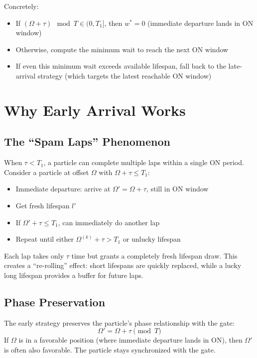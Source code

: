 \documentclass{article}
\begin{document}
Concretely:
\begin{itemize}
    \item If $(\Omega + \tau) \mod T \in (0, T_1]$, then $w^* = 0$ (immediate departure lands in ON window)
    \item Otherwise, compute the minimum wait to reach the next ON window
    \item If even this minimum wait exceeds available lifespan, fall back to the late-arrival strategy (which targets the latest reachable ON window)
\end{itemize}

\section{Why Early Arrival Works}

\subsection{The ``Spam Laps'' Phenomenon}

When $\tau < T_1$, a particle can complete multiple laps within a single ON period. Consider a particle at offset $\Omega$ with $\Omega + \tau \leq T_1$:
\begin{itemize}
    \item Immediate departure: arrive at $\Omega' = \Omega + \tau$, still in ON window
    \item Get fresh lifespan $l'$
    \item If $\Omega' + \tau \leq T_1$, can immediately do another lap
    \item Repeat until either $\Omega^{(k)} + \tau > T_1$ or unlucky lifespan
\end{itemize}

Each lap takes only $\tau$ time but grants a completely fresh lifespan draw. This creates a ``re-rolling'' effect: short lifespans are quickly replaced, while a lucky long lifespan provides a buffer for future laps.

\subsection{Phase Preservation}

The early strategy preserves the particle's phase relationship with the gate:
\[
\Omega' = \Omega + \tau \pmod{T}
\]
If $\Omega$ is in a favorable position (where immediate departure lands in ON), then $\Omega'$ is often also favorable. The particle stays synchronized with the gate.
\end{document}
